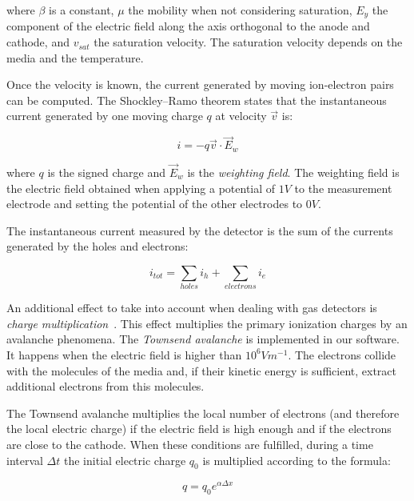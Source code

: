 \documentclass[11pt]{article}
\begin{document}
	where $\beta$ is a constant, $\mu$ the mobility when not considering saturation,
	$E_y$ the component of the electric field along the axis orthogonal to the anode and cathode,
	and $v_{sat}$ the saturation velocity. The saturation velocity depends on the
	media and the temperature.

	Once the velocity is known, the current generated by moving ion-electron
	pairs can be computed. The Shockley–Ramo theorem states that the instantaneous current generated
	by one moving charge $q$ at velocity $\vec{v}$ is:

	\begin{equation}
		i = -q \vec{v} \cdot \vec{E}_w
		\label{eq:ramo}
	\end{equation}

	where $q$ is the signed charge and $\vec{E}_w$ is the \textit{weighting field}. The weighting field is the electric field
	obtained when applying a potential of $1V$ to the measurement electrode and setting
	the potential of the other electrodes to $0V$.

	The instantaneous current measured
	by the detector is the sum of the currents generated by the holes and electrons:

	\begin{equation}
		i_{tot} = \sum_{holes} i_h + \sum_{electrons} i_e
		\label{eq:tot_current}
	\end{equation}

	An additional effect to take into account  when dealing with gas detectors is
	\textit{charge multiplication}~\cite{lphy2236}. This effect
	multiplies the primary ionization charges by an avalanche phenomena.
	The \textit{Townsend avalanche} is implemented in our software. It happens
	when the electric field is higher than $10^6Vm^{-1}$. The electrons collide
	with the molecules of the media and, if their kinetic energy is sufficient,
	extract additional electrons from this molecules.

	The Townsend avalanche multiplies the local number of electrons (and therefore the local electric
	charge) if the electric field is high enough and if the electrons are close
	to the cathode. When these conditions are fulfilled, during a time interval
	$\Delta t$ the initial electric charge $q_0$ is multiplied
	according to the formula:

	\begin{equation}
		q = q_0 e^{\alpha \Delta x}
		\label{eq:townsend}
	\end{equation}
\end{document}
